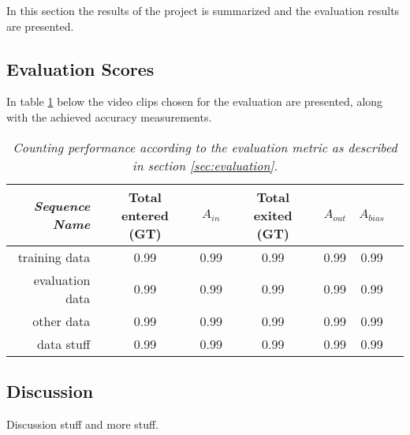 In this section the results of the project is summarized and the evaluation results are presented.

\subsection{Evaluation Scores}
In table \ref{tab:evaluation_performance} below the video clips chosen for the evaluation are presented, along with the achieved accuracy measurements.

\begin{table}[h]
\centering
	\begin{tabular}{r | c | c | c | c | c | c }
		\emph{Sequence Name}		&  Total entered (GT) & \emph{$A_{in}$} & Total exited (GT) & \emph{$A_{out}$} & \emph{$A_{bias}$}\\
		\hline \hline
		training data			& 0.99 & 0.99 & 0.99 & 0.99 & 0.99 \\
		evaluation data			& 0.99 & 0.99 & 0.99 & 0.99 & 0.99 \\
		other data				& 0.99 & 0.99 & 0.99 & 0.99 & 0.99 \\
		data stuff 				& 0.99 & 0.99 & 0.99 & 0.99 & 0.99 \\
	\end{tabular}
	\caption[System performance]{\textit{Counting performance according to the evaluation metric as described in section \ref{sec:evaluation}.}}
	\label{tab:evaluation_performance}
\end{table}


\subsection{Discussion}
Discussion stuff and more stuff.


